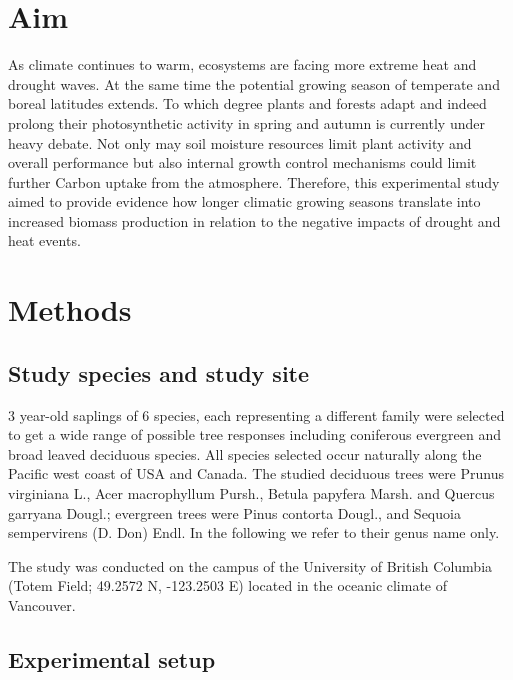 \documentclass{article}
\begin{document}
	\renewcommand{\bibname}{References}%
	
	
	
	
	\date{\today}
	
	\section*{Aim}
	As climate continues to warm, ecosystems are facing more extreme heat and drought waves. At the same time the potential growing season of temperate and boreal latitudes extends. To which degree plants and forests adapt and indeed prolong their photosynthetic activity in spring and autumn is currently under heavy debate. Not only may soil moisture resources limit plant activity and overall performance but also internal growth control mechanisms could limit further Carbon uptake from the atmosphere. Therefore, this experimental study aimed to provide evidence how longer climatic growing seasons translate into increased biomass production in relation to the negative impacts of drought and heat events. 
	
	\section*{Methods}
	\subsection*{Study species and study site}
	3 year-old saplings of 6 species, each representing a different family were selected to get a wide range of possible tree responses including coniferous evergreen and broad leaved deciduous species. All species selected occur naturally along the Pacific west coast of USA and Canada. The studied deciduous trees were Prunus virginiana L., Acer macrophyllum Pursh., Betula papyfera Marsh. and Quercus garryana Dougl.; evergreen trees were Pinus contorta Dougl., and Sequoia sempervirens (D. Don) Endl. In the following we refer to their genus name only.
	
	The study was conducted on the campus of the University of British Columbia (Totem Field; 49.2572 N, -123.2503 E) located in the oceanic climate of Vancouver. 
	
	\subsection*{Experimental setup}
		
\end{document}

